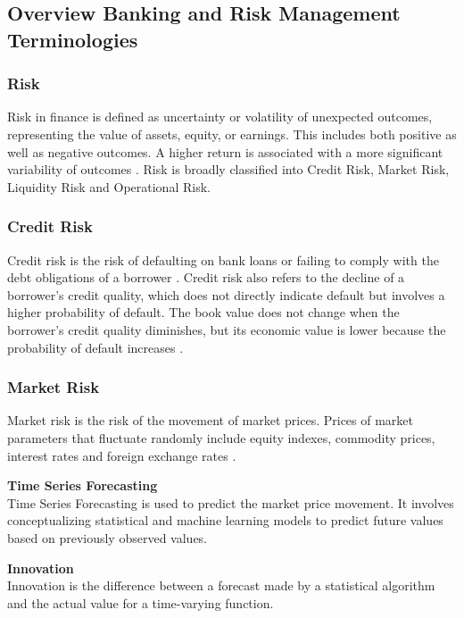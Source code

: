 \documentclass[a4paper, 12pt]{article}
\begin{document}
\vskip 0.2in
\subsection{Overview Banking and Risk Management Terminologies}
\subsubsection{Risk}
\noindent Risk in finance is defined as uncertainty or volatility of unexpected outcomes, representing the value of assets, equity, or earnings. This includes both positive as well as negative outcomes. A higher return is associated with a more significant variability of outcomes \cite{jorion2000value}. Risk is broadly classified into Credit Risk, Market Risk, Liquidity Risk and Operational Risk.
\vskip 0.2in
\subsubsection{Credit Risk}
\noindent Credit risk is the risk of defaulting on bank loans or failing to comply with the debt obligations of a borrower \cite{kanchu2013risk}. Credit risk also refers to the decline of a borrower's credit quality, which does not directly indicate default but involves a higher probability of default. The book value does not change when the borrower's credit quality diminishes, but its economic value is lower because the probability of default increases \cite{bessis2011risk}.

\vskip 0.2in
\subsubsection{Market Risk}
\noindent Market risk is the risk of the movement of market prices. Prices of market parameters that fluctuate randomly include equity indexes, commodity prices, interest rates and foreign exchange rates \cite{bessis2011risk}.

\vskip 0.2in
\noindent\textbf{Time Series Forecasting} \\
\noindent Time Series Forecasting is used to predict the market price movement. It involves conceptualizing statistical and machine learning models to predict future values based on previously observed values.

\vskip 0.2in
\noindent\textbf{Innovation} \\
\noindent Innovation is the difference between a forecast made by a statistical algorithm and the actual value for a time-varying function.
\end{document}
